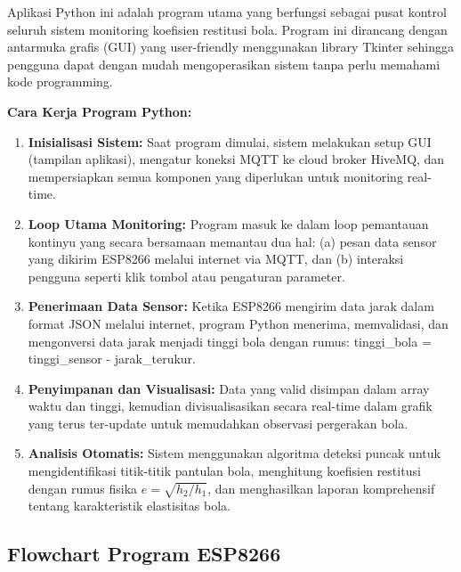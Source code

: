 \documentclass[a4paper,10pt]{article}
\begin{document}
Aplikasi Python ini adalah program utama yang berfungsi sebagai pusat kontrol seluruh sistem monitoring koefisien restitusi bola. Program ini dirancang dengan antarmuka grafis (GUI) yang user-friendly menggunakan library Tkinter sehingga pengguna dapat dengan mudah mengoperasikan sistem tanpa perlu memahami kode programming.

\textbf{Cara Kerja Program Python:}
\begin{enumerate}
\item \textbf{Inisialisasi Sistem:} Saat program dimulai, sistem melakukan setup GUI (tampilan aplikasi), mengatur koneksi MQTT ke cloud broker HiveMQ, dan mempersiapkan semua komponen yang diperlukan untuk monitoring real-time.

\item \textbf{Loop Utama Monitoring:} Program masuk ke dalam loop pemantauan kontinyu yang secara bersamaan memantau dua hal: (a) pesan data sensor yang dikirim ESP8266 melalui internet via MQTT, dan (b) interaksi pengguna seperti klik tombol atau pengaturan parameter.

\item \textbf{Penerimaan Data Sensor:} Ketika ESP8266 mengirim data jarak dalam format JSON melalui internet, program Python menerima, memvalidasi, dan mengonversi data jarak menjadi tinggi bola dengan rumus: tinggi\_bola = tinggi\_sensor - jarak\_terukur.

\item \textbf{Penyimpanan dan Visualisasi:} Data yang valid disimpan dalam array waktu dan tinggi, kemudian divisualisasikan secara real-time dalam grafik yang terus ter-update untuk memudahkan observasi pergerakan bola.

\item \textbf{Analisis Otomatis:} Sistem menggunakan algoritma deteksi puncak untuk mengidentifikasi titik-titik pantulan bola, menghitung koefisien restitusi dengan rumus fisika $e = \sqrt{h_2/h_1}$, dan menghasilkan laporan komprehensif tentang karakteristik elastisitas bola.
\end{enumerate}

\newpage

\subsection{Flowchart Program ESP8266}
\end{document}
